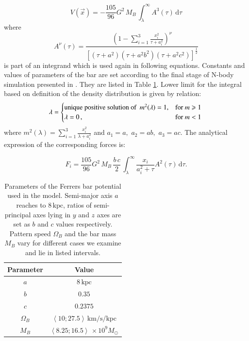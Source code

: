 \documentclass[a4paper,fleqn,usenatbib]{mnras}
\begin{document}
\begin{equation}
	V(\vec{x}) = -\frac{105}{96}G^2\,M_B\,\int_{\lambda}^{\infty} A^{3}(\tau)\,\mathrm{d} \tau
\end{equation}
where
\begin{equation}
	A^{\nu}(\tau) = \frac{\left(1- \sum_{i=1}^{3} \frac{x_i^2}{\tau + a_i^2}\right)^{\nu}}{[(\tau + a^2)(\tau + a^2b^2)(\tau + a^2c^2)]^\frac{1}{2}}
\end{equation}
is part of an integrand which is used again in following equations. Constants and values of parameters of the bar are set according to the final stage of N-body simulation presented in \cite{MachadoManos:2016}. They are listed in Table \ref{tab:potential_params)}. Lower limit for the integral based on definition of the density distribution is given by relation:
\begin{equation}
	\lambda = \begin{cases}
	\text{unique positive solution of} \,\,\, m^2(\lambda)=1, &  \text{for}\ m \geq 1\\
	\lambda = 0\,, & \text{for}\ m < 1
	\end{cases} \\
\end{equation}
where $ m^2(\lambda) = \sum_{i=1}^{3} \frac{x_i^2}{\lambda + a_i^2} $ and $ a_1 = a,\,\,a_2 = ab,\,\,a_3 = ac $.	
The analytical expression of the corresponding
forces is:

\begin{equation}
	F_i = \frac{105}{96}G^2\,M_B\,\frac{b\,c}{2}\, \int_{\lambda}^{\infty} \frac{x_i}{a_i^2 + \tau} A^{2}(\tau)\,\mathrm{d} \tau.
\end{equation}  


\begin{table}
	\centering
	\caption{Parameters of the Ferrers bar potential used in the model. Semi-major axis $a$ reaches to $ 8\,\mathrm{kpc} $, ratios of semi-principal axes lying in $y$ and $z$ axes are set as $b$ and $c$ values respectively. Pattern speed $\Omega_B$ and the bar mass $M_B$ vary for different cases we examine and lie in listed intervals.}
	\label{tab:potential_params)}
	\begin{tabular}{cc} %
		\hline
		Parameter & Value \\
		\hline
		$ a $ & $8\,\mathrm{kpc}$\\
		$ b $ & $ 0.35 $\\
		$ c $ & $ 0.2375 $\\
		$ \Omega_B $ & $ \left< 10;27.5\right>\,\mathrm{km/s/kpc} $\\
		$ M_{B} $ & $ \left<8.25;16.5\right>\, \times 10^{9} M_{\odot}$\\
		\hline
	\end{tabular}
\end{table}
\end{document}
